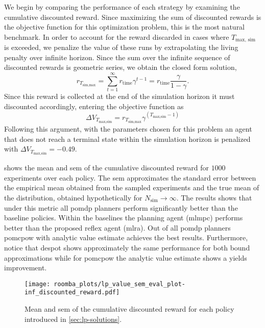 We begin by comparing the performance of each strategy by examining the
cumulative discounted reward. Since maximizing the sum of discounted rewards is
the objective function for this optimization problem, this is the most natural
benchmark. In order to account for the reward discarded in cases where
$T_\text{max, sim}$ is exceeded, we penalize the value of these runs by
extrapolating the living penalty over infinite horizon. Since the sum over the
infinite sequence of discounted rewards is geometric series, we obtain the
closed form solution,
\begin{equation}
  r_{T_\text{sim,max}} = \sum_{t=1}^\infty r_\text{time} \gamma^{t-1} =  r_\text{time} \frac{\gamma}{1-\gamma}.
\end{equation}
Since this reward is collected at the end of the simulation horizon it must
discounted accordingly, entering the objective function as
\begin{equation}
  \Delta V_{T_\text{max,sim}} = r_{T_\text{sim,max}} \gamma^{(T_\text{max,sim} - 1)}
\end{equation}
Following this argument, with the parameters chosen for this problem an agent
that does not reach a terminal state within the simulation horizon is penalized
with $\Delta V_{T_\text{max,sim}} = -0.49$.

 shows the mean and \ac{sem} of the cumulative
discounted reward for $1000$ experiments over each policy. The \ac{sem}
approximates the standard error between the empirical mean obtained from the
sampled experiments and the true mean of the distribution, obtained
hypothetically for $N_\text{sim} \to \infty$. The results shows that under this
metric all \ac{pomdp} planners perform significantly better than the baseline
policies. Within the baselines the planning agent (\ac{mlmpc}) performs better
than the proposed reflex agent (\ac{mlra}). Out of all \ac{pomdp} planners
\ac{pomcpow} with analytic value estimate achieves the best results. Furthermore,
notice that \ac{despot} shows approximately the same performance for both bound
approximations while for \ac{pomcpow} the analytic value estimate shows a yields
improvement.

\begin{figure}[H]
  \centering
  \texttt{[image: roomba\_plots/lp\_value\_sem\_eval\_plot-inf\_discounted\_reward.pdf]}
  \caption{Mean and \acf{sem} of the cumulative discounted reward for each policy introduced in \cref{sec:lp-solutions}.}
  \label{fig:lp-value-sem-inf-discounted}
\end{figure}

